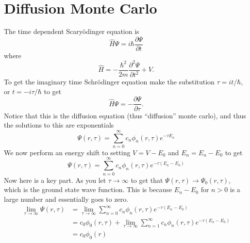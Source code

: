 \section*{Diffusion Monte Carlo}
The time dependent Scary\"odinger equation is
\begin{equation}
  \hat H \Psi = i \hbar \frac{\partial \Psi}{\partial t}
\end{equation}
where
\begin{equation}
  \hat H = -\frac{\hbar^2}{2m}\frac{\partial^2\Psi}{\partial t^2} + V.
\end{equation}
To get the imaginary time Schr\"odinger equation make the substitution $\tau=i t/\hbar$, or $t=-i \tau / \hbar$ to get
\begin{equation}
  \hat H \Psi = - \frac{\partial \Psi}{\partial \tau}.
\end{equation}
Notice that this is the diffusion equation (thus ``diffusion'' monte carlo), and thus the solutions to this are exponentials
\begin{equation}
  \Psi(r,\tau) = \sum\limits_{n=0}^\infty c_n \phi_n(r,\tau) e^{- \tau E_n}
\end{equation}
We now perform an energy shift to setting $V=V-E_0$ and $E_n=E_n-E_0$ to get
\begin{equation}
  \Psi(r,\tau) = \sum\limits_{n=0}^\infty c_n \phi_n(r,\tau) e^{- \tau (E_n-E_0)}
\end{equation}
Now here is a key part. As you let $\tau \rightarrow \infty$ to get that $\Psi(r,\tau) \rightarrow \Psi_0(r,\tau)$, which is the ground state wave function. This is because $E_n-E_0$ for $n>0$ is a large number and essentially goes to zero.
\begin{equation}
  \begin{split}
    \lim_{\tau \to \infty} \Psi(r,\tau) &= \lim_{\tau \to \infty} \sum\limits_{n=0}^\infty c_n \phi_n(r,\tau) e^{- \tau (E_n-E_0)} \\
    &= c_0 \phi_0(r,\tau) + \lim_{\tau \to \infty} \sum\limits_{n=1}^\infty c_n \phi_n(r,\tau) e^{- \tau (E_n-E_0)} \\
    &= c_0 \phi_0(r)
  \end{split}
\end{equation}

